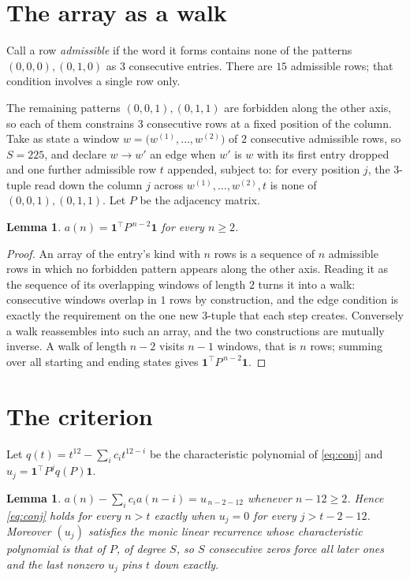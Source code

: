 \documentclass[11pt,a4paper]{article}
\theoremstyle{plain}
\newtheorem{lemma}[theorem]{Lemma}
\theoremstyle{definition}
\begin{document}
\section{The array as a walk}

Call a row \emph{admissible} if the word it forms contains none of the patterns
$(0,0,0), (0,1,0)$ as $3$ consecutive entries. There are $15$ admissible rows; that condition
involves a single row only.

The remaining patterns $(0,0,1), (0,1,1)$ are forbidden along the other axis, so each of them
constrains $3$ consecutive rows at a fixed position of the column. Take as state a
window $w=\bigl(w^{(1)},\dots,w^{(2)}\bigr)$ of $2$ consecutive admissible
rows, so $S=225$, and declare $w\to w'$ an edge when $w'$ is $w$ with its first entry
dropped and one further admissible row $t$ appended, subject to: for every position
$j$, the $3$-tuple read down the column $j$ across $w^{(1)},\dots,w^{(2)},t$
is none of $(0,0,1), (0,1,1)$. Let $P$ be the adjacency matrix.

\begin{lemma}\label{lem:walk}
$a(n)=\mathbf{1}^{\!\top}P^{\,n-2}\mathbf{1}$ for every $n\ge2$.
\end{lemma}

\begin{proof}
An array of the entry's kind with $n$ rows is a sequence of $n$ admissible rows in
which no forbidden pattern appears along the other axis. Reading it as the sequence of its
overlapping windows of length $2$ turns it into a walk: consecutive windows overlap in
$1$ rows by construction, and the edge condition is exactly the requirement on the one
new $3$-tuple that each step creates. Conversely a walk reassembles into such an array,
and the two constructions are mutually inverse. A walk of length $n-2$ visits $n-1$
windows, that is $n$ rows; summing over all starting and ending states gives
$\mathbf{1}^{\!\top}P^{\,n-2}\mathbf{1}$.
\end{proof}

\section{The criterion}

Let $q(t)=t^{12}-\sum_i c_i t^{12-i}$ be the characteristic polynomial of
\eqref{eq:conj} and $u_j=\mathbf{1}^{\!\top}P^{j}q(P)\mathbf{1}$.

\begin{lemma}\label{lem:crit}
$a(n)-\sum_i c_i a(n-i)=u_{\,n-2-12}$ whenever $n-12\ge2$. Hence
\eqref{eq:conj} holds for every $n>t$ exactly when $u_j=0$ for every
$j>t-2-12$. Moreover $(u_j)$ satisfies the monic linear recurrence whose
characteristic polynomial is that of $P$, of degree $S$, so $S$ consecutive zeros force all
later ones and the last nonzero $u_j$ pins $t$ down exactly.
\end{lemma}
\end{document}
